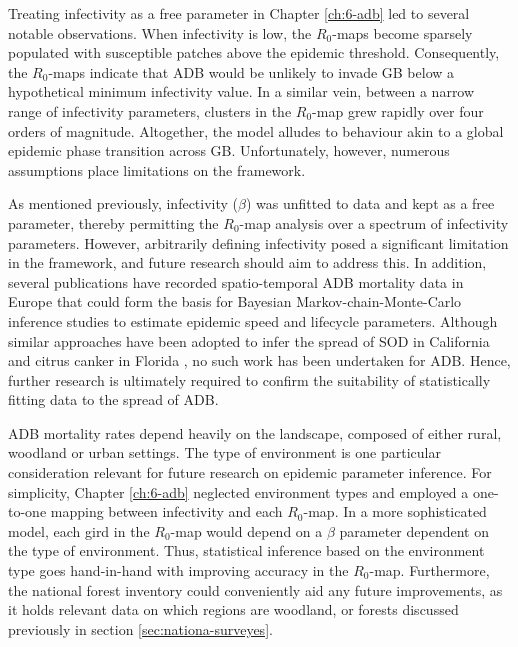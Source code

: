 Treating infectivity as a free parameter in Chapter \ref{ch:6-adb} led to several notable observations. When infectivity is low, the $R_0$-maps become sparsely populated with susceptible patches above the epidemic threshold. Consequently, the $R_0$-maps indicate that ADB would be unlikely to invade GB below a hypothetical minimum infectivity value.
In a similar vein, between a narrow range of infectivity parameters, clusters in the $R_0$-map grew rapidly over four orders of magnitude.
Altogether, the model alludes to behaviour akin to a global epidemic phase transition across GB. Unfortunately, however, numerous assumptions place limitations on the framework.

As mentioned previously, infectivity ($\beta$) was unfitted to data and kept as a free parameter, thereby permitting the $R_0$-map analysis over a spectrum of infectivity parameters. However, arbitrarily defining infectivity posed a significant limitation in the framework, and future research should aim to address this. In addition, several publications have recorded spatio-temporal ADB mortality data in Europe \cite{https://doi.org/10.1111/1365-2745.13383, https://doi.org/10.1002/ppp3.11, stocks2017first, lohmus2014ash} that could form the basis for Bayesian Markov-chain-Monte-Carlo inference studies to estimate epidemic speed and lifecycle parameters.
Although similar approaches have been adopted to infer the spread of SOD in California \cite{10.1371/journal.pcbi.1002328} and citrus canker in Florida \cite{neri2014bayesian}, no such work has been undertaken for ADB.
Hence, further research is ultimately required to confirm the suitability of statistically fitting data to the spread of ADB. 

ADB mortality rates depend heavily on the landscape, composed of either rural, woodland or urban settings.
The type of environment is one particular consideration relevant for future research on epidemic parameter inference.
For simplicity, Chapter \ref{ch:6-adb} neglected environment types and employed a one-to-one mapping between infectivity and each $R_0$-map. In a more sophisticated model, each gird in the $R_0$-map would depend on a $\beta$ parameter dependent on the type of environment.
Thus, statistical inference based on the environment type goes hand-in-hand with improving accuracy in the $R_0$-map.
Furthermore, the national forest inventory could conveniently aid any future improvements, as it holds relevant data on which regions are woodland, or forests\textemdash
discussed previously in section \ref{sec:nationa-surveyes}.

